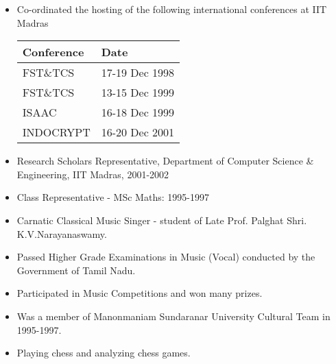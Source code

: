 \documentclass[11pt]{article}
\begin{document}
\vspace{0.5cm}


\vspace{0.1cm}

\begin{itemize}
\item Co-ordinated the hosting of the following international
conferences at IIT Madras

\vspace{0.1cm}

\begin{center}
\begin{tabular}{|l|l|}\hline
Conference & Date \\ \hline
FST\&TCS & 17-19 Dec 1998\\
FST\&TCS & 13-15 Dec 1999\\
ISAAC & 16-18 Dec 1999\\
INDOCRYPT & 16-20 Dec 2001\\ \hline
\end{tabular}
\end{center}

\vspace{0.1cm}
\item Research Scholars Representative, Department of Computer Science
\& Engineering, IIT Madras, 2001-2002
\item Class Representative - MSc Maths: 1995-1997

\end{itemize}

\vspace{0.1cm}


\vspace{0.1cm}

\begin{itemize}
\item Carnatic Classical Music Singer - student of Late Prof. Palghat
  Shri. K.V.Narayanaswamy.
\item Passed Higher Grade Examinations in Music (Vocal) conducted by
  the Government of Tamil Nadu.
\item Participated in Music Competitions and won many prizes. 
\item Was a member of Manonmaniam Sundaranar University Cultural Team
  in 1995-1997.
\item Playing chess and analyzing chess games.
\end{itemize}
\end{document}
